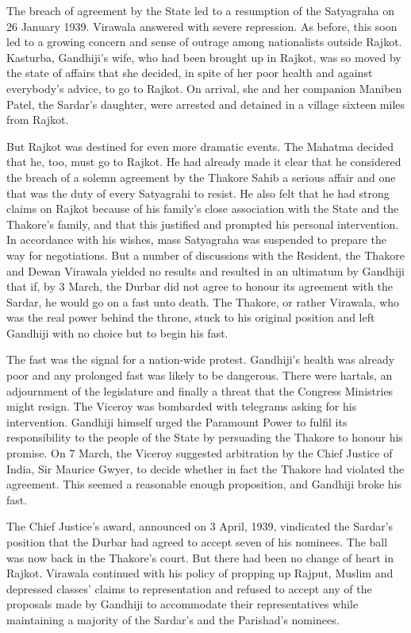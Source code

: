 The breach of agreement by the State led to a resumption of the Satyagraha on 26 January 1939. Virawala answered with severe repression. As before, this soon led to a growing concern and sense of outrage among nationalists outside Rajkot. Kasturba, Gandhiji's wife, who had been brought up in Rajkot, was so moved by the state of affairs that she decided, in spite of her poor health and against everybody's advice, to go to Rajkot. On arrival, she and her companion Maniben Patel, the Sardar's daughter, were arrested and detained in a village sixteen miles from Rajkot. 

But Rajkot was destined for even more dramatic events. The Mahatma decided that he, too, must go to Rajkot. He had already made it clear that he considered the breach of a solemn agreement by the Thakore Sahib a serious affair and one that was the duty of every Satyagrahi to resist. He also felt that he had strong claims on Rajkot because of his family's close association with the State and the Thakore's family, and that this justified and prompted his personal intervention. In accordance with his wishes, mass Satyagraha was suspended to prepare the way for negotiations. But a number of discussions with the Resident, the Thakore and Dewan Virawala yielded no results and resulted in an ultimatum by Gandhiji that if, by 3 March, the Durbar did not agree to honour its agreement with the Sardar, he would go on a fast unto death. The Thakore, or rather Virawala, who was the real power behind the throne, stuck to his original position and left Gandhiji with no choice but to begin his fast. 

The fast was the signal for a nation-wide protest. Gandhiji's health was already poor and any prolonged fast was likely to be dangerous. There were hartals, an adjournment of the legislature and finally a threat that the Congress Ministries might resign. The Viceroy was bombarded with telegrams asking for his intervention. Gandhiji himself urged the Paramount Power to fulfil its responsibility to the people of the State by persuading the Thakore to honour his promise. On 7 March, the Viceroy suggested arbitration by the Chief Justice of India, Sir Maurice Gwyer, to decide whether in fact the Thakore had violated the agreement. This seemed a reasonable enough proposition, and Gandhiji broke his fast. 

The Chief Justice's award, announced on 3 April, 1939, vindicated the Sardar's position that the Durbar had agreed to accept seven of his nominees. The ball was now back in the Thakore's court. But there had been no change of heart in Rajkot. Virawala continued with his policy of propping up Rajput, Muslim and depressed classes' claims to representation and refused to accept any of the proposals made by Gandhiji to accommodate their representatives while maintaining a majority of the Sardar's and the Parishad's nominees. 

